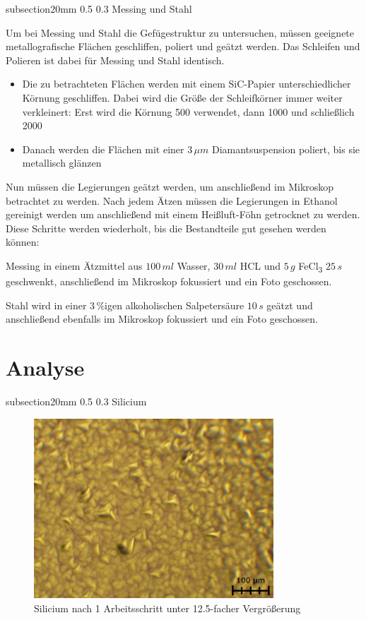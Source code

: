 \documentclass[german, %
parskip=full, %
bibliography=totoc, %
]{scrartcl}
\makeatletter
\renewcommand\subsection{\@startsection 
   {subsection}{2}{0mm}%
   {0.5\baselineskip}%
   {0.3\baselineskip}%
   {\bfseries\sffamily\large}%
   }
\makeatother
\begin{document}
\subsection{Messing und Stahl}

Um bei Messing und Stahl die Gefügestruktur zu untersuchen, müssen geeignete metallografische Flächen geschliffen, poliert und geätzt werden. Das Schleifen und Polieren ist dabei für Messing und Stahl identisch. 

\begin{itemize}
\item[1.] Die zu betrachteten Flächen werden mit einem SiC-Papier unterschiedlicher Körnung geschliffen. Dabei wird die Größe der Schleifkörner immer weiter verkleinert: Erst wird die Körnung 500 verwendet, dann 1000 und schließlich 2000
\item[2.] Danach werden die Flächen mit einer $3\,\mu m$ Diamantsuspension poliert, bis sie metallisch glänzen
\end{itemize}

Nun müssen die Legierungen geätzt werden, um anschließend im Mikroskop betrachtet zu werden. Nach jedem Ätzen müssen die Legierungen in Ethanol gereinigt werden um anschließend mit einem Heißluft-Föhn getrocknet zu werden. Diese Schritte werden wiederholt, bis die Bestandteile gut gesehen werden können:

Messing in einem Ätzmittel aus $100\,ml$ Wasser, $30\,ml$ HCL und $5\,g$ FeCl\textsubscript{3} $25\,s$ geschwenkt, anschließend im Mikroskop fokussiert und ein Foto geschossen.

Stahl wird in einer $3\,\%$igen alkoholischen Salpetersäure $10\,s$ geätzt und anschließend ebenfalls im Mikroskop fokussiert und ein Foto geschossen.

\section{Analyse}

\subsection{Silicium}

\begin{figure}[ht] 
  \centering
     \includegraphics[width=0.8\textwidth]{Silicium_1_12}
  \caption{Silicium nach 1 Arbeitsschritt unter 12.5-facher Vergrößerung}
  \label{fig:sil112}
\end{figure}
\end{document}
